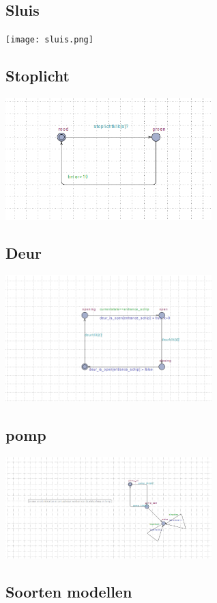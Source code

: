 \documentclass{article}
\begin{document}
	\subsection{Sluis}
	\texttt{[image: sluis.png]} %
	\subsection{Stoplicht}
		\includegraphics[width=8cm]{stoplicht.png} %
	\subsection{Deur}	
	\includegraphics[width=8cm]{deur.png} %
		\subsection{pomp}	
	\includegraphics[width=8cm]{pomp.png} %
	
	\subsection{Soorten modellen}
	
\end{document}
